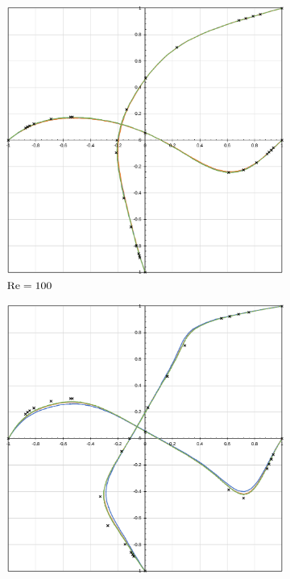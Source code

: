 \begin{figure}[h!]
    \centering
    \caption{Cavidade bidimensional - Valores do campo de velocidades sobre as linhas médias.}
    \begin{subfigure}{0.4\textwidth}
        \includegraphics[width=\linewidth]{Figuras/Cavity/Re100.pdf}
        \caption{$\mathrm{Re}=100$}
    \end{subfigure}
    \begin{subfigure}{0.4\textwidth}
        \includegraphics[width=\linewidth]{Figuras/Cavity/Re400.pdf}

\end{subfigure}
\end{figure}
